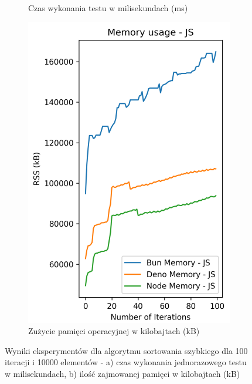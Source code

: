 \begin{figure}[H]
\begin{subfigure}[b]{0.44\textwidth}
    \caption{Czas wykonania testu w milisekundach (ms)}
    \label{fig:quick_sorting_e3_time}
  \end{subfigure}
  \begin{subfigure}[b]{0.44\textwidth}
    \centering
    \includegraphics[width=\textwidth]{Figures/sorting/sorting_quick_100_10000_js_memory.png}
    \caption{Zużycie pamięci operacyjnej w kilobajtach (kB)}
    \label{fig:quick_sorting_e3_memory}
  \end{subfigure}
  \caption{Wyniki eksperymentów dla algorytmu sortowania szybkiego dla 100 iteracji i 10000 elementów - a) czas wykonania jednorazowego testu w milisekundach, b) ilość zajmowanej pamięci w kilobajtach (kB)}
  \label{fig:quick_sorting_e3}
\end{figure}

